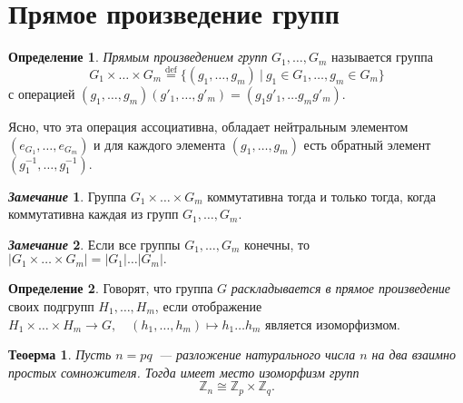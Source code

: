 \documentclass[a4paper, 14pt]{extarticle}
\newcommand{\deq}{\stackrel{\mathrm{def}}{=}}
\newcommand{\n}{\par}
\newcommand{\integers}{\mathbb{Z}}
\theoremstyle{definition}
\newtheorem*{remark}{\textit{Замечание}}
\newtheorem{definition}{Определение}
\theoremstyle{plain}
\newtheorem{theorem}{Теоерма}
\numberwithin{theorem}{section}
\numberwithin{definition}{section}
\numberwithin{statement}{section}
\numberwithin{lemma}{section}
\numberwithin{consequence}{section}
\begin{document}
	\section{Прямое произведение групп}
	\setcounter{definition}{0}
	\begin{definition}
		\textit{Прямым произведением групп} $G_1, \ldots, G_m$ называется группа
		\begin{equation*}
			G_1 \times \ldots \times G_m \deq \{(g_1, \ldots, g_m) \ | \ g_1 \in G_1, \ldots, g_m \in G_m\}
		\end{equation*}
		с операцией $(g_1, \ldots, g_m)(g'_1, \ldots, g'_m) = (g_1g'_1, \ldots g_mg'_m).$ \n
		Ясно, что эта операция ассоциативна, обладает нейтральным элементом $(e_{G_1}, \ldots, e_{G_m})$ и для каждого элемента $(g_1, \ldots, g_m)$ есть обратный элемент $(g^{-1}_1, \ldots, g^{-1}_1).$
	\end{definition}
	\begin{remark}
		Группа $G_1 \times \ldots \times G_m$ коммутативна тогда и только тогда, когда коммутативна каждая из групп $G_1, \ldots, G_m.$
	\end{remark}
	\begin{remark}
		Если все группы ${G_1, \ldots, G_m}$ конечны, то ${|G_1 \times \ldots \times G_m| = |G_1| \ldots |G_m|.}$
	\end{remark}
	\begin{definition}
		Говорят, что группа $G$ \textit{раскладывается в прямое произведение} своих подгрупп ${H_1, \ldots, H_m}$, если отображение
		${H_1 \times \ldots \times H_m \rightarrow G, \quad (h_1, \ldots, h_m) \mapsto h_1 \ldots h_m}$ является изоморфизмом.
	\end{definition}
	\begin{theorem}
		Пусть ${n = pq}$~--- разложение натурального числа $n$ на два взаимно простых сомножителя. Тогда имеет место изоморфизм групп
		\begin{equation*}
			\integers_n \cong \integers_p \times \integers_q.
		\end{equation*}
	\end{theorem}
	\newpage
\end{document}
